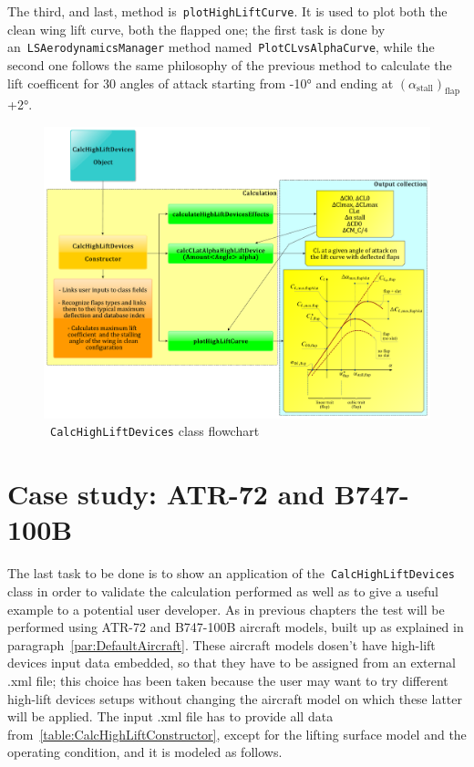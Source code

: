 \bigskip
\noindent
The third, and last, method is~\lstinline[language=Java]!plotHighLiftCurve!. It is used to plot both the clean wing lift curve, both the flapped one; the first task is done by an~\lstinline[language=Java]!LSAerodynamicsManager! method named~\lstinline[language=Java]!PlotCLvsAlphaCurve!, while the second one follows the same philosophy of the previous method to calculate the lift coefficent for 30 angles of attack starting from -10° and ending at $\left(\alpha_{\text{stall}}\right)_{\text{flap}}$+2°.
%
\begin{figure}[H]
  \centering
  \includegraphics[width=1.15\linewidth]{HighLiftDevices_Flowchart}
  \caption{~\lstinline[language=Java]!CalcHighLiftDevices! class flowchart}
  \label{fig:CalcHighLiftFlowchart}
\end{figure}
%
\section{Case study: ATR-72 and B747-100B}
\label{par:CaseStudyHighLift}
The last task to be done is to show an application of the~\lstinline[language=Java]!CalcHighLiftDevices! class in order to validate the calculation performed as well as to give a useful example to a potential user developer. 
%
As in previous chapters the test will be performed using ATR-72 and B747-100B aircraft models, built up as explained in paragraph~\ref{par:DefaultAircraft}. These aircraft models dosen't have high-lift devices input data embedded, so that they have to be assigned from an external .xml file; this choice has been taken because the user may want to try different high-lift devices setups without changing the aircraft model on which these latter will be applied.
%
The input .xml file\cite{wiki:xml} has to provide all data from~\ref{table:CalcHighLiftConstructor}, except for the lifting surface model and the operating condition, and it is modeled as follows.

